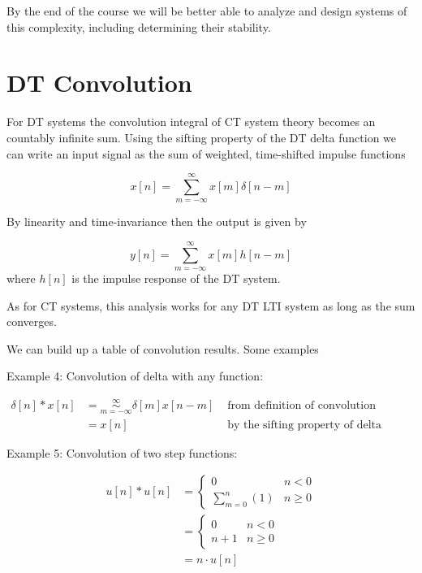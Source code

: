 \documentclass{article}
\begin{document}
By the end of the course we will be better able to analyze and design systems of this complexity, including determining their stability.

\section{DT Convolution}

For DT systems the convolution integral of CT system theory becomes an countably infinite sum. Using the sifting property of the DT delta function we can write an input signal as the sum of weighted, time-shifted impulse functions

\begin{equation}
  x[n] = \sum\limits_{m = -\infty}^{\infty} x[m]\delta[n-m]
\end{equation}

By linearity and time-invariance then the output is given by

\begin{equation}
y[n] = \sum\limits_{m = -\infty}^{\infty} x[m]h[n-m]
\end{equation}
where $h[n]$ is the impulse response of the DT system.

As for CT systems, this analysis works for any DT LTI system as long as the sum converges.

We can build up a table of convolution results. Some examples

Example 4: Convolution of delta with any function:

\begin{align}
  \delta[n] * x[n] &= \sim\limits_{m = -\infty}^{\infty} \delta[m]x[n-m] & \text{ from definition of convolution}\\
  &= x[n] & \text{ by the sifting property of delta function}
\end{align}

Example 5: Convolution of two step functions:

\begin{align}
u[n] * u[n] &= \left\{\begin{array}{cc}
  0 & n < 0\\
  \sum\limits_{m = 0}^{n} (1) & n \geq 0
\end{array}\right.\\
&= \left\{\begin{array}{cc}
  0 & n < 0\\
  n+1 & n \geq 0
\end{array}\right.\\
&= n\cdot u[n]
\end{align}
\end{document}
